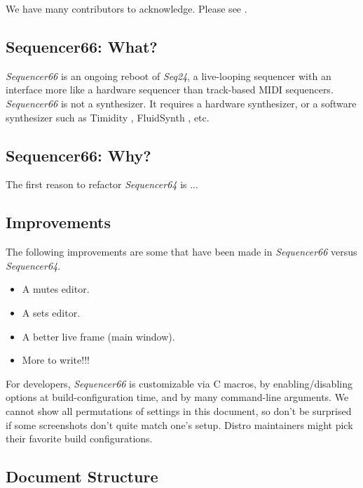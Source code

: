 \documentclass[
 11pt,
 twoside,
 a4paper,
 headinclude,
 footinclude,
 final                                 %
]{article}
\begin{document}
   We have many contributors to acknowledge.  Please see
   .

\subsection{Sequencer66: What?}
\label{subsec:what_is_sequencer66}

   \textsl{Sequencer66} is an ongoing reboot of \textsl{Seq24},
   a live-looping sequencer with an interface more like a hardware sequencer
   than track-based MIDI sequencers.
   \textsl{Sequencer66} is not a synthesizer.  It requires a hardware
   synthesizer, or a software synthesizer such as Timidity \cite{timidity},
   FluidSynth \cite{fluidsynth}, etc.

\subsection{Sequencer66: Why?}
\label{subsec:introduction_seq66_vs_others}

   The first reason to refactor \textsl{Sequencer64} is ...

\subsection{Improvements}
\label{subsec:improvements}

   The following improvements are some that have been made in
   \textsl{Sequencer66} versus \textsl{Sequencer64}.

   \begin{itemize}
      \item A mutes editor.
      \item A sets editor.
      \item A better live frame (main window).
      \item More to write!!!
   \end{itemize}

   For developers, \textsl{Sequencer66} is customizable via C macros,
   by enabling/disabling options at build-configuration time, and by many
   command-line arguments.  We cannot show all permutations of settings in this
   document, so don't be surprised if some screenshots don't quite match
   one's setup.  Distro maintainers might pick their favorite build
   configurations.

\subsection{Document Structure}
\label{subsec:introduction_document_structure}
\end{document}
